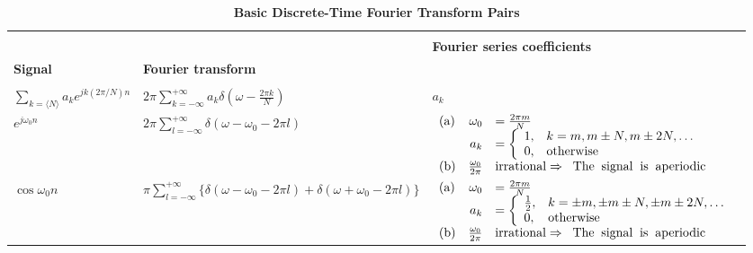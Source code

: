 \documentclass[12pt]{article}
\numberwithin{equation}{section}
\begin{document}
\begin{table}[htbp]
\begin{center}
\vspace*{-2.0pc}
\caption{\bf Basic Discrete-Time Fourier Transform Pairs}
 \hspace*{-8.6pc}
\begin{tabular}{l|l|l}\hline
& & \\
& & {\bf Fourier series coefficients} \\
{\bf Signal}
  & {\bf Fourier transform}
  & \hspace{.40in}{\bf (if periodic)}
  \\
& &\\ \hline {\footnotesize $\displaystyle \sum_{k=\langle
N\rangle} a_{k}
  e^{jk(2\pi /N)n}$}
  & {\footnotesize $\displaystyle  2\pi \sum^{+\infty}_{k=-\infty}
    a_{k} \delta\left(\omega-\frac{2\pi k}{N}\right)$}
  & $\displaystyle a_{k}$ \\ \hline
$\displaystyle e^{j\omega_{0}n}$ &{\footnotesize $\displaystyle
2\pi\sum^{+\infty}_{l=-\infty}\delta(\omega - \omega_0-2\pi l)$} &
{\footnotesize $\displaystyle  \begin{array}{lrl}{\rm (a)} &
\omega_{0} & =  \frac{2\pi m}{N}\\& a_{k} & =
\left\{\begin{array}{ll}1, & k=m,m\pm N,m\pm 2N,\ldots\\ 0, &{\rm
otherwise}\end{array}\right.\\{\rm (b)} & \frac{\omega_{0}}{2\pi}
&{\rm irrational}\Rightarrow\;\;{\rm
The\;\;signal\;\;is\;\;aperiodic}\end{array}$}\\\hline
%
$\displaystyle \cos \omega_{0}n$ & {\footnotesize $\displaystyle
\pi\sum^{+\infty}_{l=-\infty}\{\delta(\omega- \omega_{0}-2\pi
l)+\delta(\omega+ \omega_{0}-2\pi l)\}$} & {\footnotesize
$\displaystyle  \begin{array}{lrl}{\rm (a)} & \omega_{0} & =
\frac{2\pi m}{N}\\ & a_{k} & =
\left\{\begin{array}{ll}\frac{1}{2}, & k=\pm m,\pm m\pm N,\pm m\pm
2N,\ldots\\ 0, &{\rm otherwise}\end{array}\right.\\{\rm (b)} &
\frac{\omega_{0}}{2\pi}& {\rm irrational}\Rightarrow\;\;{\rm
The\;\;signal\;\;is\;\;aperiodic}\end{array}$}\\\hline

\end{tabular}
\end{center}
\end{table}
\end{document}
